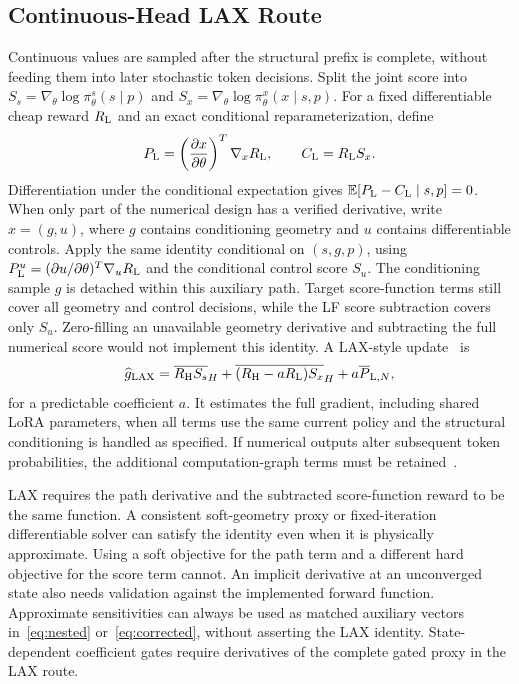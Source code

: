 \subsection{Continuous-Head LAX Route}
Continuous values are sampled after the structural prefix is complete, without feeding them into later stochastic token decisions. Split the joint score into $S_s=\nabla_\theta\log\pi^s_\theta(s\mid p)$ and $S_x=\nabla_\theta\log\pi^x_\theta(x\mid s,p)$. For a fixed differentiable cheap reward $R_{\mathrm{L}}$ and an exact conditional reparameterization, define
\begin{equation}
P_{\mathrm{L}}=\left(\frac{\partial x}{\partial\theta}\right)^T\nabla_x R_{\mathrm{L}},
\qquad C_{\mathrm{L}}=R_{\mathrm{L}} S_x.
\label{eq:pathwise}
\end{equation}
Differentiation under the conditional expectation gives $\mathbb{E}[P_{\mathrm{L}}-C_{\mathrm{L}}\mid s,p]=0$.
When only part of the numerical design has a verified derivative, write $x=(g,u)$, where $g$ contains conditioning geometry and $u$ contains differentiable controls. Apply the same identity conditional on $(s,g,p)$, using $P_{\mathrm{L}}^u=(\partial u/\partial\theta)^T\nabla_u R_{\mathrm{L}}$ and the conditional control score $S_u$. The conditioning sample $g$ is detached within this auxiliary path. Target score-function terms still cover all geometry and control decisions, while the LF score subtraction covers only $S_u$. Zero-filling an unavailable geometry derivative and subtracting the full numerical score would not implement this identity.
 A LAX-style update~\cite{grathwohl2018relax} is
\begin{equation}
\widehat g_{\rm LAX}
 =\overline{R_{\mathrm{H}} S_s}_H
  +\overline{(R_{\mathrm{H}}-aR_{\mathrm{L}})S_x}_H+a\overline P_{\mathrm{L},N},
\label{eq:lax}
\end{equation}
for a predictable coefficient $a$. It estimates the full gradient, including shared LoRA parameters, when all terms use the same current policy and the structural conditioning is handled as specified. If numerical outputs alter subsequent token probabilities, the additional computation-graph terms must be retained~\cite{alvo2026hpo}.

LAX requires the path derivative and the subtracted score-function reward to be the same function. A consistent soft-geometry proxy or fixed-iteration differentiable solver can satisfy the identity even when it is physically approximate. Using a soft objective for the path term and a different hard objective for the score term cannot. An implicit derivative at an unconverged state also needs validation against the implemented forward function. Approximate sensitivities can always be used as matched auxiliary vectors in~\eqref{eq:nested} or~\eqref{eq:corrected}, without asserting the LAX identity. State-dependent coefficient gates require derivatives of the complete gated proxy in the LAX route.

